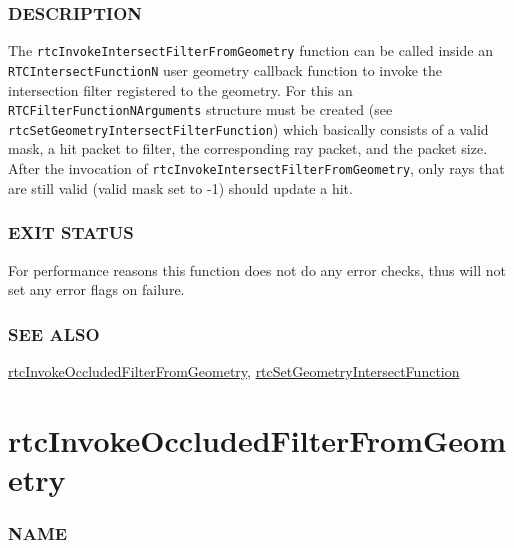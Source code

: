 \subsubsection{DESCRIPTION}\label{description}

The \texttt{rtcInvokeIntersectFilterFromGeometry} function can be called
inside an \texttt{RTCIntersectFunctionN} user geometry callback function
to invoke the intersection filter registered to the geometry. For this
an \texttt{RTCFilterFunctionNArguments} structure must be created (see
\texttt{rtcSetGeometryIntersectFilterFunction}) which basically consists
of a valid mask, a hit packet to filter, the corresponding ray packet,
and the packet size. After the invocation of
\texttt{rtcInvokeIntersectFilterFromGeometry}, only rays that are still
valid (valid mask set to -1) should update a hit.

\subsubsection{EXIT STATUS}\label{exit-status}

For performance reasons this function does not do any error checks, thus
will not set any error flags on failure.

\subsubsection{SEE ALSO}\label{see-also}

\hyperref[rtcinvokeoccludedfilterfromgeometry]{rtcInvokeOccludedFilterFromGeometry},
\hyperref[rtcsetgeometryintersectfunction]{rtcSetGeometryIntersectFunction}

\pagebreak

\section{rtcInvokeOccludedFilterFromGeometry}\label{rtcinvokeoccludedfilterfromgeometry}

\subsubsection{NAME}\label{name}

\begin{Shaded}
\begin{Highlighting}[]
\OperatorTok{{-}}
\end{Highlighting}
\end{Shaded}

